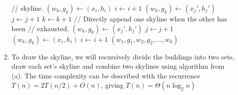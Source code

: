 \documentclass{article}
\begin{document}
\begin{enumerate}
\begin{enumerate}
\begin{algorithmic}[1]
                        \State // skyline.
                            \State $(w_k, g_k) \gets (x_i, h_i)$
                        \EndIf
                        \State $i \gets i + 1$
                    \Else
                            \State $(w_k, g_k) \gets (x_j', h_j')$
                        \EndIf
                        \State $j \gets j + 1$
                    \EndIf
                \EndIf
                \State $k \gets k + 1$
                \State // Directly append one skyline when the other has been
                \State // exhausted.
                        \State $(w_k, g_k) \gets (x_j', h_j')$
                        \State $j \gets j + 1$
                    \EndWhile
                        \State $(w_k, g_k) \gets (x_i, h_i)$
                        \State $i \gets i + 1$
                    \EndWhile
                \EndIf
            \State \Return $(w_1, g_1, w_2, g_2, \dots, w_k)$
        \end{algorithmic}

        \item To draw the skyline, we will recursively divide the buildings into two sets, draw each set's skyline and combine two skylines using algorithm from (a). The time complexity can be described with the recurrence $T(n) = 2T(n/2) + O(n)$, giving $T(n) = \Theta(n\log_2 n)$
    \end{enumerate}
\end{enumerate}
\end{document}
